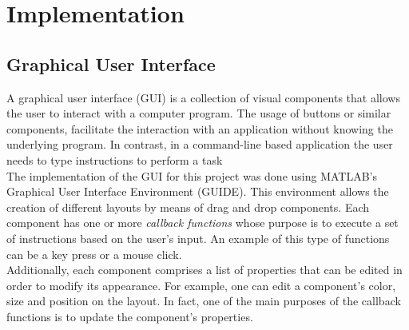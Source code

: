 \documentclass[12pt,a4paper]{article} %
\begin{document}
\section{Implementation}
\subsection{Graphical User Interface}
A graphical user interface (GUI) is a collection of visual components that allows the user to interact with a computer program. The usage of buttons or similar components, facilitate the interaction with an application without knowing the underlying program.  In contrast, in a command-line based application the user needs to type instructions to perform a task \cite{Mathworks:2011:Online}
\newline
\\The implementation of the GUI for this project was done using MATLAB’s Graphical User Interface Environment (GUIDE). This environment allows the creation of different layouts by means of drag and drop components. Each component has one or more \textit{callback functions} whose purpose is to execute a set of instructions based on the user’s input. An example of this type of functions can be a key press or a mouse click.
\newline
\\Additionally, each component comprises a list of properties that can be edited in order to modify its appearance. For example, one can edit a component’s color, size and position on the layout. In fact, one of the main purposes of the callback functions is to update the component’s properties.
\end{document}
